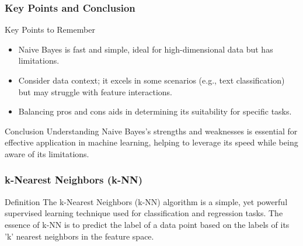 \documentclass[aspectratio=169]{beamer}
\begin{document}
\begin{frame}[fragile]
    \frametitle{Key Points and Conclusion}
    \begin{block}{Key Points to Remember}
        \begin{itemize}
            \item Naive Bayes is fast and simple, ideal for high-dimensional data but has limitations.
            \item Consider data context; it excels in some scenarios (e.g., text classification) but may struggle with feature interactions.
            \item Balancing pros and cons aids in determining its suitability for specific tasks.
        \end{itemize}
    \end{block}

    \begin{block}{Conclusion}
        Understanding Naive Bayes's strengths and weaknesses is essential for effective application in machine learning, helping to leverage its speed while being aware of its limitations.
    \end{block}
\end{frame}

\begin{frame}
  \frametitle{k-Nearest Neighbors (k-NN)}
  \begin{block}{Definition}
    The k-Nearest Neighbors (k-NN) algorithm is a simple, yet powerful supervised learning technique used for classification and regression tasks. The essence of k-NN is to predict the label of a data point based on the labels of its 'k' nearest neighbors in the feature space.
  \end{block}
\end{frame}
\end{document}
